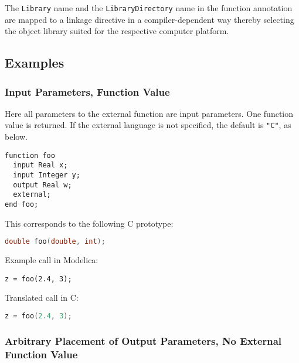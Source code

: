 The {\lstinline!Library!} name and the {\lstinline!LibraryDirectory!} name in the function annotation are mapped to a linkage directive in a compiler-dependent way thereby selecting the object library suited for the respective computer platform.

\subsection{Examples}\label{examples1}

\subsubsection{Input Parameters, Function Value}\label{input-parameters-function-value}

\begin{example}
Here all parameters to the external function are input parameters.
One function value is returned.
If the external language is not specified, the default is {\lstinline!"C"!}, as below.
\begin{lstlisting}[language=modelica]
function foo
  input Real x;
  input Integer y;
  output Real w;
  external;
end foo;
\end{lstlisting}
This corresponds to the following C prototype:
\begin{lstlisting}[language=C]
double foo(double, int);
\end{lstlisting}

Example call in Modelica:
\begin{lstlisting}[language=modelica]
z = foo(2.4, 3);
\end{lstlisting}
Translated call in C:
\begin{lstlisting}[language=C]
z = foo(2.4, 3);
\end{lstlisting}
\end{example}

\subsubsection{Arbitrary Placement of Output Parameters, No External Function Value}\label{arbitrary-placement-of-output-parameters-no-external-function-value}

